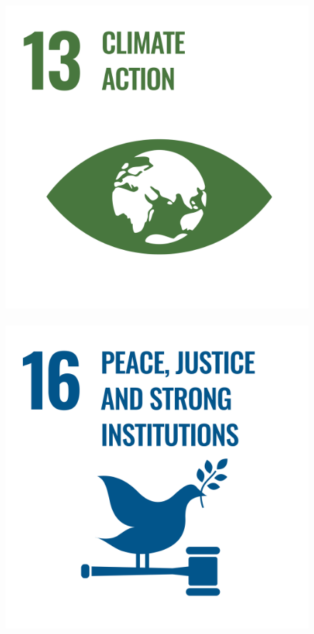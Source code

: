 \documentclass[../SustainableHEP.tex]{subfiles}
\begin{document}
\begin{figure}
\includegraphics[width=\SDGsize]{Sections/Figs/Common/SDG_13_ClimateAction.png}~%
\includegraphics[width=\SDGsize]{Sections/Figs/Common/SDG_16_PeaceJusticeStrongInstitutions.png}~%

\end{figure}
\end{document}
